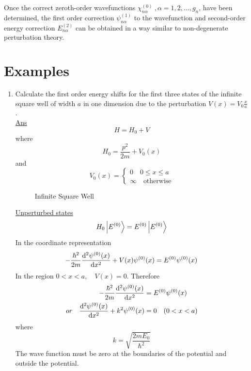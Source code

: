 		Once the correct zeroth-order wavefunctions $\chi_{n\alpha}^{(0)}\ , \alpha=1,2, \ldots, g_n$, have been determined, the first order correction $\psi_{n \alpha}^{(1)}$ to the wavefunction and second-order energy correction $E_{n\alpha}^{(2)}$ can be obtained in a way similar to non-degenerate perturbation theory.
		
		
		
		\section{Examples}
		\begin{enumerate}
			\item 
			Calculate the first order energy shifts for the first three states of the infinite square well of width $a$ in one dimension due to the perturbation $V(x) = V_0 \frac{x}{a}$.\\
			
			\underline{Ans}\\
			\begin{equation*}
				H = H_0 + V
			\end{equation*}
			where
			\begin{equation*}
				H_0 = \frac{p^2}{2m} + V_0(x)
			\end{equation*}
			and
			\begin{equation*}
				V_0(x) = \begin{cases}
				0 \quad 0 \leq x \leq a \\
				\infty \quad \text{otherwise}
				\end{cases}
			\end{equation*}
			
			
			\begin{figure}
				
				\caption{Infinite Square Well}
			\end{figure}
			
			\underline{Unperturbed states}
			\begin{equation*}
				H_0 \ket{E^{(0)}} = E^{(0)} \ket{E^{(0)}}
			\end{equation*}
			In the coordinate representation
			\begin{equation*}
				-\frac{\hbar^2}{2 m} \dv[2]{\psi^{(0)}\qty(x)}{x} + V\qty(x) \psi^{(0)}\qty(x) = E^{(0)} \psi^{(0)}\qty(x)
			\end{equation*}
			In the region $0 < x < a,\quad V(x) = 0$. Therefore
			\begin{align}
				-\frac{\hbar^2}{2 m} \dv[2]{\psi^{(0)}\qty(x)}{x} 
				&= E^{(0)} \psi^{(0)}\qty(x) \nonumber\\
		or\quad		\dv[2]{\psi^{(0)}\qty(x)}{x} + k^2 \psi^{(0)}\qty(x) &= 0 \quad (0 < x < a)
			\label{chapter20.ex1.eqn1}
			\end{align}
			where
			\begin{equation*}
				k = \sqrt{\frac{2 m E_0}{\hbar^2}}
			\end{equation*}
			The wave function must be zero at the boundaries of the potential and outside the potential.\\
			

\end{enumerate}
